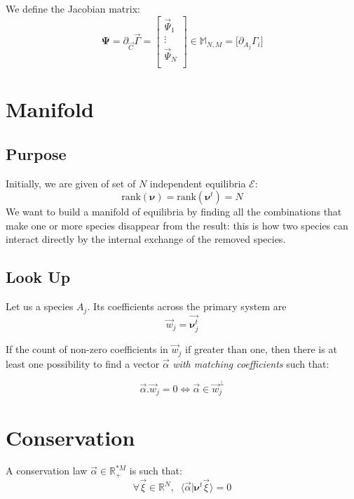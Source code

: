 \documentclass[aps,12pt]{revtex4}
\begin{document}
We define the Jacobian matrix:
\begin{equation}
\bm{\Psi} = \partial_{\vec{C}} \vec{\Gamma} = 
\begin{bmatrix}
	\vec{\Psi}_1\\
	\vdots\\
	\vec{\Psi}_N\\
	\end{bmatrix}
	\in \mathbb{M}_{N,M} = 
	\lbrack \partial_{A_j}\Gamma_i \rbrack
\end{equation}

\section{Manifold}
\subsection{Purpose}
Initially, we are given of set of $N$ independent equilibria $\mathcal{E}$:
\begin{equation}
	\mathrm{rank}(\bm{\nu}) = \mathrm{rank}(\bm{\nu}^t) = N
\end{equation}
We want to build a manifold of equilibria by finding
all the combinations that make one or more species disappear from
the result: this is how two species can interact directly by
the internal exchange of the removed species.
\subsection{Look Up}
Let us a species $A_j$. Its coefficients across the
primary system are
\begin{equation}
	\vec{w}_j = \vec{\bm{\nu}^t_{j}}
\end{equation}

If the count of non-zero coefficients in  $\vec{w}_j$ if greater than one,
then there is at least one possibility to find a vector $\vec{\alpha}$ \emph{with matching coefficients} such
that:

\begin{equation}
	\vec{\alpha}.\vec{w}_j=0 \Leftrightarrow \vec{\alpha} \in \vec{w}_j^\perp
\end{equation}

\section{Conservation}


A conservation law $\vec{\alpha}\in\mathbb{R}_+^{*M}$ is such that:
\begin{equation}
	\forall \vec{\xi} \in \mathbb{R}^N, \;\; \langle \vec{\alpha} \vert \bm{\nu}^t \vec{\xi} \rangle = 0
\end{equation}
\end{document}
